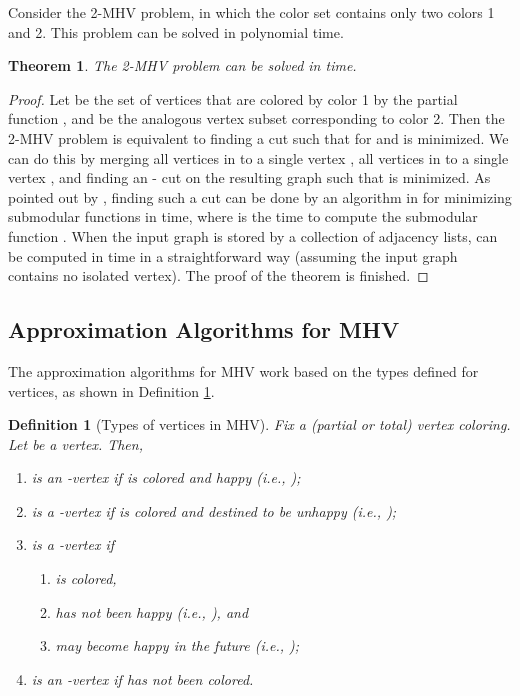 \documentclass[11pt]{article}
\newtheorem{theorem}{Theorem}[section]
\newtheorem{definition}{Definition}[section]
\newcommand{\qed}{\vrule height4pt width4pt depth2pt}
\begin{document}
Consider the 2-MHV problem, in which the color set  contains only two
colors 1 and 2. This problem can be solved in polynomial
time.

\begin{theorem}
The 2-MHV problem can be solved in  time.
\end{theorem}
\begin{proof}
Let  be the set of vertices
that are colored by color 1 by the partial function , and 
be the analogous vertex subset corresponding to color 2.
Then the 2-MHV problem is equivalent to finding a cut 
such that  for  and 
is minimized. We can do this by merging all vertices in  to
a single vertex , all vertices in  to a single vertex ,
and finding an - cut  on the resulting graph such that
 is minimized.
As pointed out by \cite[Lemma 3]{ZNI05}, finding such a cut can be done
by an algorithm in \cite{IFF01} for minimizing submodular functions
in   time, where  is the time to compute
the submodular function .
When the input graph is stored by a collection of adjacency lists,
 can be computed in  time in a straightforward way
(assuming the input graph contains no isolated vertex).
The proof of the theorem is finished.
\qed
\end{proof}




\subsection{Approximation Algorithms for MHV}
\label{subsec - Approxalgs for MHV}
The approximation algorithms for MHV work based on the types defined for
vertices, as shown in Definition \ref{def - types of vertices in MHV}.

\begin{definition}[Types of vertices in MHV]
\label{def - types of vertices in MHV}
Fix a (partial or total) vertex coloring. Let  be a vertex. Then,
\begin{enumerate}
\item  is an {\em -vertex} if  is colored and happy (i.e., );
\item  is a {\em -vertex} if  is colored and destined to be unhappy
(i.e., );
\item  is a {\em -vertex} if
\begin{enumerate}
    \item  is colored,
    \item  has not been happy (i.e., ), and
    \item  may become happy in the future (i.e., );
\end{enumerate}
\item  is an {\em -vertex} if  has not been colored.
\end{enumerate}
\end{definition}
\end{document}
